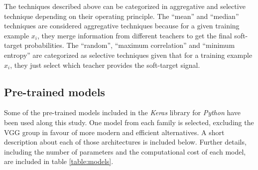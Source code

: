  The techniques described above can be categorized in aggregative and selective technique depending on their operating principle. The ``mean'' and ``median'' techniques are considered aggregative techniques because for a given training example $x_i$, they merge information from different teachers to get the final soft-target probabilities. The ``random'', ``maximum correlation'' and ``minimum entropy'' are categorized as selective techniques given that for a training example $x_i$, they just select which teacher provides the soft-target signal.  

 \subsection{Pre-trained models}
 Some of the pre-trained models included in the \textit{Keras} library for \textit{Python} \autocite{chollet2015keras} have been used along this study. One model from each family is selected, excluding the VGG group in favour of more modern and efficient alternatives. A short description about each of those architectures is included below. Further details, including the number of parameters and the computational cost of each model, are included in table \ref{table:models}.

